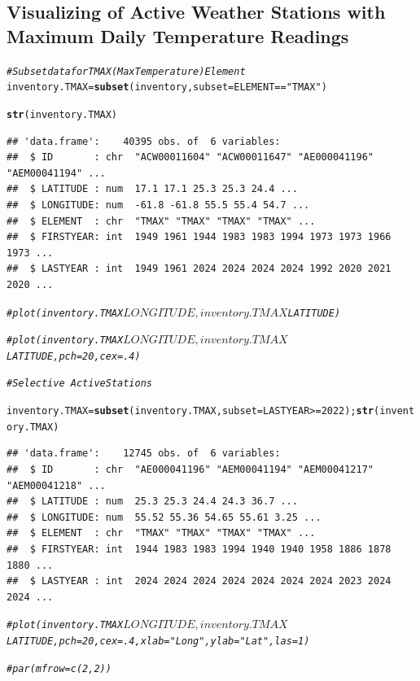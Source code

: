 \documentclass{article}\usepackage[]{graphicx}\usepackage[]{xcolor}
\makeatletter
\newcommand{\hlnum}[1]{\textcolor[rgb]{0.686,0.059,0.569}{#1}}%
\newcommand{\hlstr}[1]{\textcolor[rgb]{0.192,0.494,0.8}{#1}}%
\newcommand{\hlcom}[1]{\textcolor[rgb]{0.678,0.584,0.686}{\textit{#1}}}%
\newcommand{\hlopt}[1]{\textcolor[rgb]{0,0,0}{#1}}%
\newcommand{\hlstd}[1]{\textcolor[rgb]{0.345,0.345,0.345}{#1}}%
\newcommand{\hlkwb}[1]{\textcolor[rgb]{0.69,0.353,0.396}{#1}}%
\newcommand{\hlkwc}[1]{\textcolor[rgb]{0.333,0.667,0.333}{#1}}%
\newcommand{\hlkwd}[1]{\textcolor[rgb]{0.737,0.353,0.396}{\textbf{#1}}}%
\newenvironment{kframe}{%
 \def\at@end@of@kframe{}%
 \ifinner\ifhmode%
  \def\at@end@of@kframe{\end{minipage}}%
  \begin{minipage}{\columnwidth}%
 \fi\fi%
 \def\FrameCommand##1{\hskip\@totalleftmargin \hskip-\fboxsep
 \colorbox{shadecolor}{##1}\hskip-\fboxsep
     \hskip-\linewidth \hskip-\@totalleftmargin \hskip\columnwidth}%
 \MakeFramed {\advance\hsize-\width
   \@totalleftmargin\z@ \linewidth\hsize
   \@setminipage}}%
 {\par\unskip\endMakeFramed%
 \at@end@of@kframe}
\newenvironment{knitrout}{}{} %
\makeatother
\begin{document}
\subsection{Visualizing of Active Weather Stations with Maximum Daily Temperature Readings}

\begin{knitrout}
\color{fgcolor}\begin{kframe}
\begin{alltt}
\hlcom{# Subset data for TMAX  (Max Temperature) Element}
\hlstd{inventory.TMAX} \hlkwb{=} \hlkwd{subset}\hlstd{(inventory,} \hlkwc{subset}\hlstd{=ELEMENT}\hlopt{==}\hlstr{"TMAX"}\hlstd{)}

\hlkwd{str}\hlstd{(inventory.TMAX)}
\end{alltt}
\begin{verbatim}
## 'data.frame':	40395 obs. of  6 variables:
##  $ ID       : chr  "ACW00011604" "ACW00011647" "AE000041196" "AEM00041194" ...
##  $ LATITUDE : num  17.1 17.1 25.3 25.3 24.4 ...
##  $ LONGITUDE: num  -61.8 -61.8 55.5 55.4 54.7 ...
##  $ ELEMENT  : chr  "TMAX" "TMAX" "TMAX" "TMAX" ...
##  $ FIRSTYEAR: int  1949 1961 1944 1983 1983 1994 1973 1973 1966 1973 ...
##  $ LASTYEAR : int  1949 1961 2024 2024 2024 2024 1992 2020 2021 2020 ...
\end{verbatim}
\begin{alltt}
\hlcom{#plot(inventory.TMAX$LONGITUDE, inventory.TMAX$LATITUDE)}

\hlcom{#plot(inventory.TMAX$LONGITUDE, inventory.TMAX$LATITUDE, pch=20, cex=.4)}

\hlcom{# Selective ~Active Stations}

\hlstd{inventory.TMAX} \hlkwb{=} \hlkwd{subset}\hlstd{(inventory.TMAX,} \hlkwc{subset}\hlstd{=LASTYEAR}\hlopt{>=}\hlnum{2022}\hlstd{);} \hlkwd{str}\hlstd{(inventory.TMAX)}
\end{alltt}
\begin{verbatim}
## 'data.frame':	12745 obs. of  6 variables:
##  $ ID       : chr  "AE000041196" "AEM00041194" "AEM00041217" "AEM00041218" ...
##  $ LATITUDE : num  25.3 25.3 24.4 24.3 36.7 ...
##  $ LONGITUDE: num  55.52 55.36 54.65 55.61 3.25 ...
##  $ ELEMENT  : chr  "TMAX" "TMAX" "TMAX" "TMAX" ...
##  $ FIRSTYEAR: int  1944 1983 1983 1994 1940 1940 1958 1886 1878 1880 ...
##  $ LASTYEAR : int  2024 2024 2024 2024 2024 2024 2024 2023 2024 2024 ...
\end{verbatim}
\begin{alltt}
\hlcom{#plot(inventory.TMAX$LONGITUDE, inventory.TMAX$LATITUDE, pch=20, cex=.4, xlab="Long", ylab="Lat", las=1)}

\hlcom{#par(mfrow=c(2,2))}
\end{alltt}
\end{kframe}
\end{knitrout}
\end{document}
